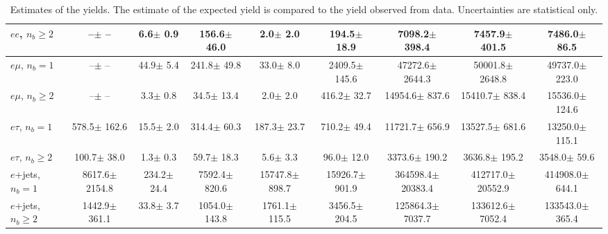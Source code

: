 \begin{sidewaystable}[p]
\begin{tabular}{l|cccccc|cc}
    $e e$, $n_b\geq2$                  &       --$\pm$     -- &      6.6$\pm$    0.9 &    156.6$\pm$   46.0 &      2.0$\pm$    2.0 &    194.5$\pm$   18.9 &   7098.2$\pm$  398.4 &   7457.9$\pm$  401.5 &   7486.0$\pm$   86.5 \\ 
    \hline
    $e\mu$, $n_b=1$                    &       --$\pm$     -- &     44.9$\pm$    5.4 &    241.8$\pm$   49.8 &     33.0$\pm$    8.0 &   2409.5$\pm$  145.6 &  47272.6$\pm$ 2644.3 &  50001.8$\pm$ 2648.8 &  49737.0$\pm$  223.0 \\ 
    $e\mu$, $n_b\geq2$                 &       --$\pm$     -- &      3.3$\pm$    0.8 &     34.5$\pm$   13.4 &      2.0$\pm$    2.0 &    416.2$\pm$   32.7 &  14954.6$\pm$  837.6 &  15410.7$\pm$  838.4 &  15536.0$\pm$  124.6 \\ 
    \hline
    $e\tau$, $n_b=1$                   &    578.5$\pm$  162.6 &     15.5$\pm$    2.0 &    314.4$\pm$   60.3 &    187.3$\pm$   23.7 &    710.2$\pm$   49.4 &  11721.7$\pm$  656.9 &  13527.5$\pm$  681.6 &  13250.0$\pm$  115.1 \\ 
    $e\tau$, $n_b\geq2$                &    100.7$\pm$   38.0 &      1.3$\pm$    0.3 &     59.7$\pm$   18.3 &      5.6$\pm$    3.3 &     96.0$\pm$   12.0 &   3373.6$\pm$  190.2 &   3636.8$\pm$  195.2 &   3548.0$\pm$   59.6 \\ 
    \hline
    $e$+jets, $n_b=1$                  &   8617.6$\pm$ 2154.8 &    234.2$\pm$   24.4 &   7592.4$\pm$  820.6 &  15747.8$\pm$  898.7 &  15926.7$\pm$  901.9 & 364598.4$\pm$20383.4 & 412717.0$\pm$20552.9 & 414908.0$\pm$  644.1 \\ 
    $e$+jets, $n_b\geq2$               &   1442.9$\pm$  361.1 &     33.8$\pm$    3.7 &   1054.0$\pm$  143.8 &   1761.1$\pm$  115.5 &   3456.5$\pm$  204.5 & 125864.3$\pm$ 7037.7 & 133612.6$\pm$ 7052.4 & 133543.0$\pm$  365.4 \\ 
    \hline

    \end{tabular}
    \caption{Estimates of the yields. The estimate of the expected yield is compared to
    the yield observed from data.  Uncertainties are statistical only.
    \label{tab:yields}}
\end{sidewaystable}
